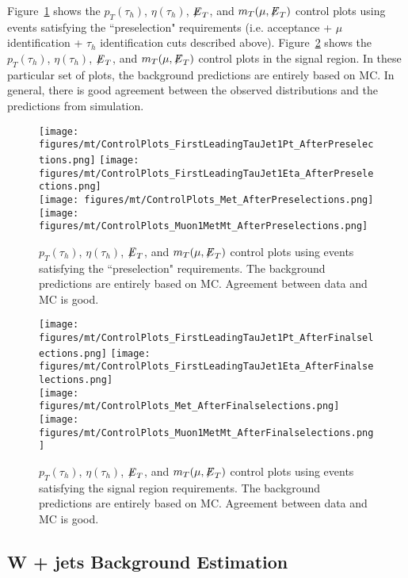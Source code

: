 Figure~\ref{fig:muTauPreselectionControlPlots} shows the $p_{T}(\tau_{h})$, $\eta(\tau_{h})$, ${\not\mathrel{E}}_T$, and $m_{T}(\mu,{\not\mathrel{E}}_T)$ control plots using events satisfying 
the ``preselection" requirements (i.e. acceptance + $\mu$ identification + $\tau_{h}$ identification cuts described above). 
Figure~\ref{fig:muTauFinalselectionControlPlots} shows the $p_{T}(\tau_{h})$, $\eta(\tau_{h})$, ${\not\mathrel{E}}_T$, and $m_{T}(\mu,{\not\mathrel{E}}_T)$ control plots in the signal region. 
In these particular set of plots, the background predictions are entirely based on MC. In general, there is good agreement between the observed distributions and the 
predictions from simulation.

\begin{figure}\centering
  \texttt{[image: figures/mt/ControlPlots\_FirstLeadingTauJet1Pt\_AfterPreselections.png]}
  \texttt{[image: figures/mt/ControlPlots\_FirstLeadingTauJet1Eta\_AfterPreselections.png]} \\
  \texttt{[image: figures/mt/ControlPlots\_Met\_AfterPreselections.png]}
  \texttt{[image: figures/mt/ControlPlots\_Muon1MetMt\_AfterPreselections.png]}
  \caption{\label{fig:muTauPreselectionControlPlots} $p_{T}(\tau_{h})$, $\eta(\tau_{h})$, ${\not\mathrel{E}}_T$, and $m_{T}(\mu,{\not\mathrel{E}}_T)$ control plots using events satisfying the 
``preselection" requirements. The background predictions are entirely based on MC. Agreement between data and MC is good.}
\end{figure}

\begin{figure}\centering
  \texttt{[image: figures/mt/ControlPlots\_FirstLeadingTauJet1Pt\_AfterFinalselections.png]}
  \texttt{[image: figures/mt/ControlPlots\_FirstLeadingTauJet1Eta\_AfterFinalselections.png]} \\
  \texttt{[image: figures/mt/ControlPlots\_Met\_AfterFinalselections.png]}
  \texttt{[image: figures/mt/ControlPlots\_Muon1MetMt\_AfterFinalselections.png]}
  \caption{\label{fig:muTauFinalselectionControlPlots} $p_{T}(\tau_{h})$, $\eta(\tau_{h})$, ${\not\mathrel{E}}_T$, and $m_{T}(\mu,{\not\mathrel{E}}_T)$ control plots using events satisfying 
the signal region requirements. The background predictions are entirely based on MC. Agreement between data and MC is good.}
\end{figure}

\subsection{W + jets Background Estimation}

